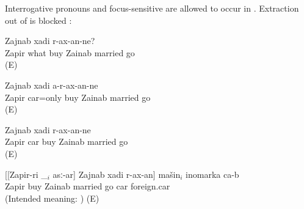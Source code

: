 Interrogative pronouns  and focus-sensitive   are allowed to occur in . Extraction out of  is blocked :
%
\begin{exe}
	\ex	\label{ex:Zapir, Zainab, and Heloise}
	\begin{xlist}
		\ex	\label{ex:If Zapir buys what Zainab will marry him}
			Zajnab	xadi	r-ax-an-ne?\\
			Zapir	what buy	Zainab	married	go\\
		\glt	{} (E) 

		\ex	\label{ex:If Zapir buys only a car, Zainab will not marry him}
		\gll	[Zapir-ri	mašin=cun	asː-ar]	Zajnab	xadi	a-r-ax-an-ne\\
			Zapir	car=only buy	Zainab	married	go\\
		\glt	{} (E) 

		\ex	\label{ex:If Zapir buys a foreign car, Zajnab will marry him}
			Zajnab	xadi	r-ax-an-ne\\
			Zapir	car buy	Zainab	married	go\\
		\glt	{} (E) 

		\ex	\label{ex:The car that if Zapir buys it Zainab will marry him is a foreign car}
		\gll	{*}	[[Zapir-ri	\_$_{i}$	asː-ar]	Zajnab	xadi	r-ax-an]	mašin$_{i}$	inomarka	ca-b\\
			{}	Zapir		buy	Zainab	married	go	car	foreign.car	\\
		\glt	(Intended meaning: ) (E) 
	\end{xlist}
\end{exe}
